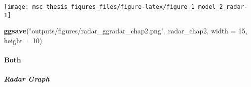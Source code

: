 \documentclass[
]{article}
\newenvironment{Shaded}{\begin{snugshade}}{\end{snugshade}}
\newcommand{\DataTypeTok}[1]{\textcolor[rgb]{0.13,0.29,0.53}{#1}}
\newcommand{\DecValTok}[1]{\textcolor[rgb]{0.00,0.00,0.81}{#1}}
\newcommand{\KeywordTok}[1]{\textcolor[rgb]{0.13,0.29,0.53}{\textbf{#1}}}
\newcommand{\NormalTok}[1]{#1}
\newcommand{\StringTok}[1]{\textcolor[rgb]{0.31,0.60,0.02}{#1}}
\begin{document}
\texttt{[image: msc\_thesis\_figures\_files/figure-latex/figure\_1\_model\_2\_radar-1]}

\begin{Shaded}
\begin{Highlighting}[]
\KeywordTok{ggsave}\NormalTok{(}\StringTok{"outputs/figures/radar_ggradar_chap2.png"}\NormalTok{, radar_chap2, }\DataTypeTok{width =} \DecValTok{15}\NormalTok{, }\DataTypeTok{height =} \DecValTok{10}\NormalTok{)}
\end{Highlighting}
\end{Shaded}

\hypertarget{both}{%
\paragraph{Both}\label{both}}

\hypertarget{radar-graph-2}{%
\subparagraph{Radar Graph}\label{radar-graph-2}}
\end{document}
